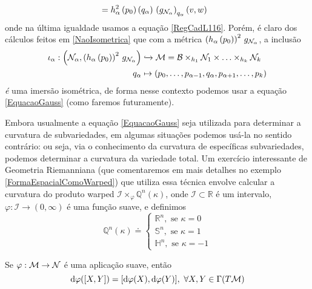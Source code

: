 \begin{oobs}
\begin{equation}
\begin{aligned}
&= h_{\alpha}^2 \left( p_0 \right) \left( q_{\alpha} \right) \, \left( g_{\mathcal{N}_{\alpha}} \right)_{q_{\alpha}}\left( v, w \right)
\end{aligned}
\end{equation}
onde na última igualdade usamos a equação \cref{RegCadL116}. Porém, é claro dos cálculos feitos em \cref{NaoIsometrica} que com a métrica $ \left( h_{\alpha}\left( p_0 \right)  \right)^2 \, g_{\mathcal{N}_{\alpha}} $, a inclusão
\[ \begin{aligned}
\iota_{\alpha}: \left(  \mathcal{N}_{\alpha}, \left( h_{\alpha}\left( p_0 \right)  \right)^2 \, g_{\mathcal{N}_{\alpha}}  \right) &\xhookrightarrow{}  \mathcal{M} = \mathcal{B} \times_{h_1} \mathcal{N}_1 \times \ldots \times_{h_k} \mathcal{N}_{k} \\
q_{\alpha} &\mapsto  \left( p_0, \ldots, p_{\alpha - 1}, q_{\alpha}, p_{\alpha + 1}, \ldots, p_k  \right) 
\end{aligned}
\]
\emph{é} uma imersão isométrica, de forma nesse contexto podemos usar a equação \cref{EquacaoGauss} (como faremos futuramente). 
\end{oobs}

\begin{oobs}
Embora usualmente a equação \cref{EquacaoGauss} seja utilizada para determinar a curvatura de subvariedades, em algumas situações podemos usá-la no sentido contrário: ou seja, via o conhecimento da curvatura de específicas subvariedades, podemos determinar a curvatura da variedade total. Um exercício interessante de Geometria Riemanniana (que comentaremos em mais detalhes no exemplo \cref{FormaEspacialComoWarped}) que utiliza essa técnica envolve calcular a curvatura do produto warped $\mathcal{I} \times_{\varphi} \mathbb{Q}^n(\kappa)$, onde $\mathcal{I} \subset \mathbb{R}$ é um intervalo, $\varphi: \mathcal{I} \to (0, \infty)$ é uma função suave, e definimos
\[
\mathbb{Q}^n(\kappa) \doteq \begin{cases}
\mathbb{R}^n, \text{ se } \kappa = 0 \\
\mathbb{S}^n, \text{ se } \kappa = 1 \\
\mathbb{H}^n, \text{ se } \kappa = -1 
\end{cases}
\]
\end{oobs}
\begin{lema}\label{PushBrack}
Se $\varphi: \mathcal{M} \to \mathcal{N}$ é uma aplicação suave, então
\[
\mathrm{d} \varphi([X, Y]) = [\mathrm{d} \varphi(X), \mathrm{d} \varphi (Y)], \ \forall X, Y \in \Gamma(T \mathcal{M})
\]
\end{lema}

